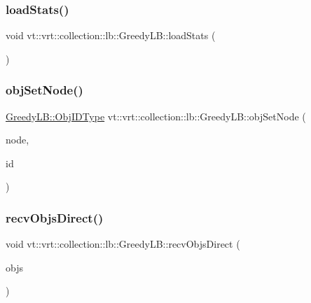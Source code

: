 \subsubsection{\texorpdfstring{load\+Stats()}{loadStats()}}
{\footnotesize\ttfamily void vt\+::vrt\+::collection\+::lb\+::\+Greedy\+L\+B\+::load\+Stats (\begin{DoxyParamCaption}{ }\end{DoxyParamCaption})\hspace{0.3cm}{\ttfamily [private]}}

\mbox{\label{structvt_1_1vrt_1_1collection_1_1lb_1_1_greedy_l_b_a38efce04a8fabdc16d89331b639f534f}} 
\subsubsection{\texorpdfstring{obj\+Set\+Node()}{objSetNode()}}
{\footnotesize\ttfamily \hyperlink{structvt_1_1vrt_1_1collection_1_1lb_1_1_base_l_b_a790b22acf448880599724749cdc4e9b3}{Greedy\+L\+B\+::\+Obj\+I\+D\+Type} vt\+::vrt\+::collection\+::lb\+::\+Greedy\+L\+B\+::obj\+Set\+Node (\begin{DoxyParamCaption}\item[{\hyperlink{namespacevt_a866da9d0efc19c0a1ce79e9e492f47e2}{Node\+Type} const \&}]{node,  }\item[{\hyperlink{structvt_1_1vrt_1_1collection_1_1lb_1_1_base_l_b_a790b22acf448880599724749cdc4e9b3}{Obj\+I\+D\+Type} const \&}]{id }\end{DoxyParamCaption})\hspace{0.3cm}{\ttfamily [private]}}

\mbox{\label{structvt_1_1vrt_1_1collection_1_1lb_1_1_greedy_l_b_a0e11225d8ff8a52f286f14a2c8f6cabb}} 
\subsubsection{\texorpdfstring{recv\+Objs\+Direct()}{recvObjsDirect()}}
{\footnotesize\ttfamily void vt\+::vrt\+::collection\+::lb\+::\+Greedy\+L\+B\+::recv\+Objs\+Direct (\begin{DoxyParamCaption}\item[{\hyperlink{structvt_1_1vrt_1_1collection_1_1lb_1_1_greedy_l_b_types_ae22670acd689e4ff83315fac2e4acb5e}{Greedy\+L\+B\+Types\+::\+Obj\+I\+D\+Type} $\ast$}]{objs }\end{DoxyParamCaption})\hspace{0.3cm}{\ttfamily [private]}}

